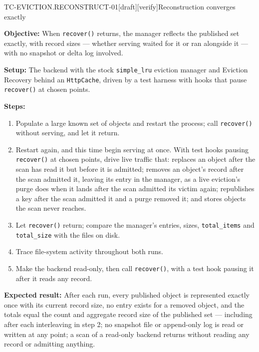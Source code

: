 \begin{requirement}{TC-EVICTION.RECONSTRUCT-01}[draft][verify]{Reconstruction converges exactly}


  \textbf{Objective:} When \texttt{recover()} returns, the manager reflects
  the published set exactly, with record sizes --- whether serving waited for
  it or ran alongside it --- with no snapshot or delta log involved.

  \textbf{Setup:} The backend with the stock \texttt{simple\_lru} eviction
  manager and Eviction Recovery behind an \texttt{HttpCache}, driven by a test
  harness with hooks that pause \texttt{recover()} at chosen points.

  \textbf{Steps:}
  \begin{enumerate}
    \item Populate a large known set of objects and restart the process;
      call \texttt{recover()} without serving, and let it return.
    \item Restart again, and this time begin serving at once. With test
      hooks pausing \texttt{recover()} at chosen points, drive live traffic
      that: replaces an object after the scan has read it but before it is
      admitted; removes an object's record after the scan admitted it,
      leaving its entry in the manager, as a live eviction's purge does when
      it lands after the scan admitted its victim again; republishes a key
      after the scan admitted it and a purge removed it;
      and stores objects the scan never reaches.
    \item Let \texttt{recover()} return; compare the manager's entries,
      sizes, \texttt{total\_items} and \texttt{total\_size} with the files on
      disk.
    \item Trace file-system activity throughout both runs.
    \item Make the backend read-only, then call \texttt{recover()}, with a
      test hook pausing it after it reads any record.
  \end{enumerate}

  \textbf{Expected result:} After each run, every published object is
  represented exactly once with its current record size, no entry exists for
  a removed object, and the totals equal the count and aggregate record size
  of the published set --- including after each interleaving in step 2; no
  snapshot file or append-only log is read or written at any point; a scan of
  a read-only backend returns without reading any record or admitting
  anything.


\end{requirement}
